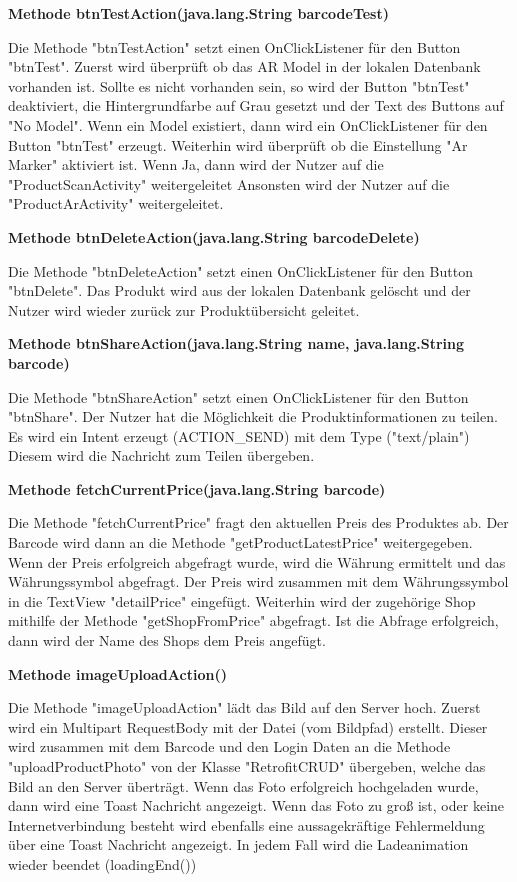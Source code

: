 \documentclass{scrartcl}
\begin{document}
\noindent\textbf{Methode btnTestAction(java.lang.String barcodeTest)} 

\noindent Die Methode "btnTestAction" setzt einen OnClickListener für den Button "btnTest". Zuerst wird überprüft ob das AR Model in der lokalen Datenbank vorhanden ist. Sollte es nicht vorhanden sein, so wird der Button "btnTest" deaktiviert, die Hintergrundfarbe auf Grau gesetzt und der Text des Buttons auf "No Model". Wenn ein Model existiert, dann wird ein OnClickListener für den Button "btnTest" erzeugt. Weiterhin wird überprüft ob die Einstellung "Ar Marker" aktiviert ist. Wenn Ja, dann wird der Nutzer auf die "ProductScanActivity" weitergeleitet Ansonsten wird der Nutzer auf die "ProductArActivity" weitergeleitet. \newline

\noindent\textbf{Methode btnDeleteAction(java.lang.String barcodeDelete)} 

\noindent Die Methode "btnDeleteAction" setzt einen OnClickListener für den Button "btnDelete". Das Produkt wird aus der lokalen Datenbank gelöscht und der Nutzer wird wieder zurück zur Produktübersicht geleitet. \newline

\noindent\textbf{Methode btnShareAction(java.lang.String name, java.lang.String barcode)} 

\noindent Die Methode "btnShareAction" setzt einen OnClickListener für den Button "btnShare". Der Nutzer hat die Möglichkeit die Produktinformationen zu teilen. Es wird ein Intent erzeugt (ACTION\_SEND) mit dem Type ("text/plain") Diesem wird die Nachricht zum Teilen übergeben. \newline 

\noindent\textbf{Methode fetchCurrentPrice(java.lang.String barcode)} 

\noindent Die Methode "fetchCurrentPrice" fragt den aktuellen Preis des Produktes ab. Der Barcode wird dann an die Methode "getProductLatestPrice" weitergegeben. Wenn der Preis erfolgreich abgefragt wurde, wird die Währung ermittelt und das Währungssymbol abgefragt. Der Preis wird zusammen mit dem Währungssymbol in die TextView "detailPrice" eingefügt. Weiterhin wird der zugehörige Shop mithilfe der Methode "getShopFromPrice" abgefragt. Ist die Abfrage erfolgreich, dann wird der Name des Shops dem Preis angefügt. \newline

\noindent\textbf{Methode imageUploadAction()} 

\noindent Die Methode "imageUploadAction" lädt das Bild auf den Server hoch. Zuerst wird ein Multipart RequestBody mit der Datei (vom Bildpfad) erstellt. Dieser wird zusammen mit dem Barcode und den Login Daten an die Methode "uploadProductPhoto" von der Klasse "RetrofitCRUD" übergeben, welche das Bild an den Server überträgt. Wenn das Foto erfolgreich hochgeladen wurde, dann wird eine Toast Nachricht angezeigt. Wenn das Foto zu groß ist, oder keine Internetverbindung besteht wird ebenfalls eine aussagekräftige Fehlermeldung über eine Toast Nachricht angezeigt. In jedem Fall wird die Ladeanimation wieder beendet (loadingEnd()) \newline 
\end{document}
